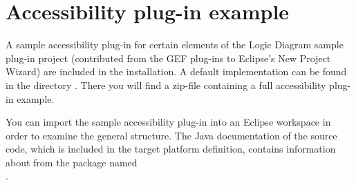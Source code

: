 \section{Accessibility plug-in example}
\label{gefreference}
A sample accessibility plug-in for certain elements of the Logic Diagram sample
plug-in project (contributed from the GEF plug-ins to Eclipse's New Project
Wizard) are included in the installation. A default implementation can
be found in the directory . There you will
find a zip-file containing a full accessibility plug-in example.

You can import the sample accessibility plug-in into an Eclipse workspace in
order to examine the general structure. %
The Java documentation of the source code, which is included in the target
platform definition, contains information about 
from the package named\\
.


